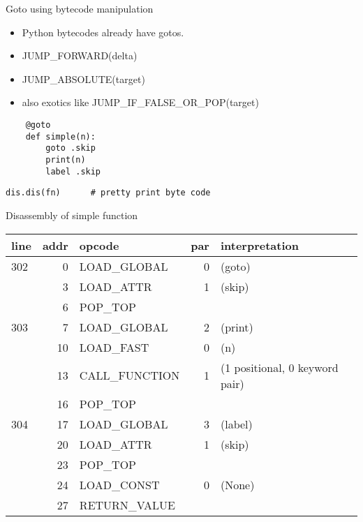 \documentclass{beamer}
\begin{document}
\begin{frame}[fragile]{Goto using bytecode manipulation}

\begin{itemize}
\item Python bytecodes already have gotos.
\item JUMP\_FORWARD(delta)
\item JUMP\_ABSOLUTE(target)
\item also exotics like JUMP\_IF\_FALSE\_OR\_POP(target)
\end{itemize}

\begin{verbatim}
    @goto
    def simple(n):
        goto .skip
        print(n)
        label .skip
\end{verbatim}

\begin{verbatim}
dis.dis(fn)      # pretty print byte code
\end{verbatim}

\end{frame}

\begin{frame}[fragile]{Disassembly of simple function}
\begin{tabular}{l|r|l|r|l}
line & addr & opcode & par & interpretation \\
\hline
302 &          0 & LOAD\_GLOBAL         &     0 & (goto)  \\
     &           3 &  LOAD\_ATTR               &   1  & (skip)  \\
      &          6 &  POP\_TOP      &  &           \\
\hline
303   &          7 &  LOAD\_GLOBAL         &       2  & (print)  \\
          &     10 &  LOAD\_FAST           &       0 &  (n)  \\
              & 13 &  CALL\_FUNCTION        &      1  & (1 positional, 0 keyword pair)  \\
     &          16 &  POP\_TOP            &     &  \\
\hline
304   &         17 &  LOAD\_GLOBAL        &        3  & (label)  \\
     &          20 &  LOAD\_ATTR          &        1  & (skip)  \\
     &          23 &  POP\_TOP            &     &  \\
\hline     
     &          24 &  LOAD\_CONST         &        0  & (None)  \\
     &          27 &  RETURN\_VALUE      &      &  \\
\end{tabular}
\end{frame}
\end{document}
